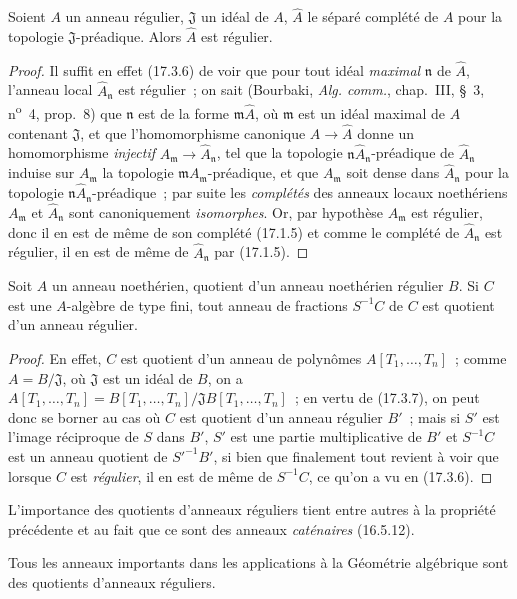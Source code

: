 \begin{lemma}[17.3.8.1]
\label{0.17.3.8.1-fr}
Soient $A$ un anneau régulier, $\mathfrak{J}$ un idéal de $A$,
$\widehat{A}$ le séparé complété de $A$ pour la topologie
$\mathfrak{J}$-préadique. Alors $\widehat{A}$ est régulier.
\end{lemma}

\begin{proof}
Il suffit en effet (17.3.6) de voir que pour tout idéal \emph{maximal}
$\mathfrak{n}$ de $\widehat{A}$, l'anneau local
$\widehat{A}_{\mathfrak{n}}$ est régulier~; on sait (Bourbaki,
\emph{Alg. comm.}, chap.~III, \S~3, n\textsuperscript{o}~4, prop.~8) que
$\mathfrak{n}$
est de la forme $\mathfrak{m}\widehat{A}$, où $\mathfrak{m}$ est un idéal
maximal de $A$ contenant $\mathfrak{J}$, et que l'homomorphisme canonique
$A\to\widehat{A}$ donne un homomorphisme \emph{injectif}
$A_{\mathfrak{m}}\to\widehat{A}_{\mathfrak{n}}$, tel que la topologie
$\mathfrak{n}\widehat{A}_{\mathfrak{n}}$-préadique de
$\widehat{A}_{\mathfrak{n}}$ induise sur $A_{\mathfrak{m}}$ la topologie
$\mathfrak{m}A_{\mathfrak{m}}$-préadique, et que $A_{\mathfrak{m}}$ soit
dense dans $\widehat{A}_{\mathfrak{n}}$ pour la topologie
$\mathfrak{n}\widehat{A}_{\mathfrak{n}}$-préadique~; par suite les
\emph{complétés} des anneaux locaux noethériens $A_{\mathfrak{m}}$ et
$\widehat{A}_{\mathfrak{n}}$ sont canoniquement \emph{isomorphes}. Or, par
hypothèse $A_{\mathfrak{m}}$ est régulier, donc il en est de même de son
complété (17.1.5) et comme le complété de $\widehat{A}_{\mathfrak{n}}$ est
régulier, il en est de même de $\widehat{A}_{\mathfrak{n}}$ par (17.1.5).
\end{proof}

\begin{corollary}[17.3.9]
\label{0.17.3.9-fr}
Soit $A$ un anneau noethérien, quotient d'un anneau noethérien régulier $B$.
Si $C$ est une $A$-algèbre de type fini, tout anneau de fractions $S^{-1}C$
de $C$ est quotient d'un anneau régulier.
\end{corollary}

\begin{proof}
En effet, $C$ est quotient d'un anneau de polynômes $A[T_1,\ldots,T_n]$~;
comme $A=B/\mathfrak{J}$, où $\mathfrak{J}$ est un idéal de $B$, on a
$A[T_1,\ldots,T_n]=B[T_1,\ldots,T_n]/\mathfrak{J}B[T_1,\ldots,T_n]$~; en
vertu de (17.3.7), on peut donc se borner au cas où $C$ est quotient d'un
anneau régulier $B'$~; mais si $S'$ est l'image réciproque de $S$ dans $B'$,
$S'$ est une partie multiplicative de $B'$ et $S^{-1}C$ est un anneau quotient de
$S'^{-1}B'$, si bien que finalement tout revient à voir que lorsque $C$ est
\emph{régulier}, il en est de même de $S^{-1}C$, ce qu'on a vu en (17.3.6).
\end{proof}

L'importance des quotients d'anneaux réguliers tient entre autres à la
propriété précédente et au fait que ce sont des anneaux \emph{caténaires}
(16.5.12).

Tous les anneaux importants dans les applications à la Géométrie algébrique
sont des quotients d'anneaux réguliers.
